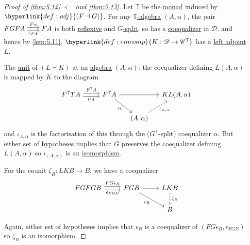 \documentclass{article}
\newenvironment{tikzcdi}{\begin{tikzcd}[cramped, sep=scriptsize]}{\end{tikzcd}}
\begin{document}
\begin{proof}[Proof of \cref{thm:5.12} $\Leftarrow$ and \cref{thm:5.13}]
  Let $\mathbb{T}$ be the \hyperlink{def:monad}{monad} induced by $\hyperlink{def:adj}{(F \dashv G)}$.
  For any \hyperlink{def:em}{$\mathbb{T}$-algebra} $(A, \alpha)$, the pair
  $
  \begin{tikzcdi}
    FGFA \rar[shift left]{F\alpha} \rar[shift right,']{\epsilon_{FA}} & FA
  \end{tikzcdi}
  $
  is both \hyperlink{def:reflexive}{reflexive} and \hyperlink{def:gsplit}{$G$-split}, so has a \hyperlink{def:equalizer}{coequalizer} in $\mathscr{D}$, and hence by \cref{lem:5.11}, $\hyperlink{def:emcomp}{K: \mathscr{D} \to \mathscr{C}^\mathbb{T}}$ has a \hyperlink{def:adj}{left adjoint} $L$.

  The \hyperlink{def:unit}{unit} of $(L \dashv K)$ at an \hyperlink{def:em}{algebra} $(A, \alpha)$: the coequalizer defining $L(A, \alpha)$ is mapped by $K$ to the diagram
  \begin{equation*}
    \begin{tikzcd}[column sep=small]
    F^\mathbb{T}TA \arrow[shift left,"F^\mathbb{T} A", rr] \arrow[rr, shift right, "\mu_A"'] && F^\mathbb{T} A \arrow[rr] \drar[']{\alpha} && KL(A,\alpha) \\
                                                                                               &&&(A,\alpha) \arrow[ur, "\iota_{A,\alpha}"', dashed]
    \end{tikzcd}
  \end{equation*}
  and $\iota_{A,\alpha}$ is the factorisation of this through the ($G^\mathbb{T}$-split) coequalizer $\alpha$.
  But either set of hypotheses implies that $G$ preserves the coequalizer defining $L(A,\alpha)$ so $\iota_{(A,\alpha)}$ is an \hyperlink{def:iso}{isomorphism}.

  For the counit $\zeta_B: LKB \to B$, we have a coequalizer
  \begin{equation*}
  \begin{tikzcd}
    FGFGB \rar[shift left]{FG\epsilon_B} \rar[shift right,']{\epsilon_{FGB}} & FGB \rar \drar[']{\epsilon_B} & LKB \dar[dashed]{\zeta_B} \\ &&B
  \end{tikzcd}
  \end{equation*}

  Again, either set of hypotheses implies that $\epsilon_B$ is a coequalizer of $(FG\epsilon_B, \epsilon_{FGB})$ so $\zeta_B$ is an isomorphism.
\end{proof}
\end{document}
